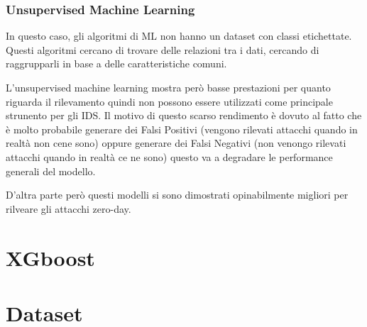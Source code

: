 \subsubsection{Unsupervised Machine Learning}

In questo caso, gli algoritmi di ML non hanno un dataset con classi etichettate. Questi algoritmi cercano di trovare delle relazioni tra i dati, cercando di raggrupparli in base a delle caratteristiche comuni.

L'unsupervised machine learning mostra però basse prestazioni per quanto riguarda il rilevamento quindi non possono essere utilizzati come principale strunento per gli IDS. Il motivo di questo scarso rendimento è dovuto al fatto che è molto probabile generare dei Falsi Positivi (vengono rilevati attacchi quando in realtà non cene sono) oppure generare dei Falsi Negativi (non venongo rilevati attacchi quando in realtà ce ne sono) questo va a degradare le performance generali del modello. ~\cite{UnsupervisedAlgorithmsDetect2021} 

D'altra parte però questi modelli si sono dimostrati opinabilmente migliori per rilveare gli attacchi zero-day. ~\cite{UnsupervisedAlgorithmsDetect2021}




\section{XGboost}


\section{Dataset}


